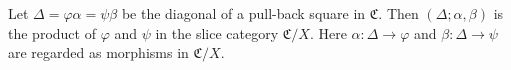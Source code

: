 Let $\Delta = \varphi \alpha = \psi \beta$ be the diagonal of a pull-back square in $\mathfrak{C}$. Then $(\Delta; \alpha, \beta)$ is the product of $\varphi$ and $\psi$ in the slice category $\mathfrak{C}/X$. Here $\alpha : \Delta \to \varphi$ and $\beta : \Delta \to \psi$ are regarded as morphisms in $\mathfrak{C}/X$.
